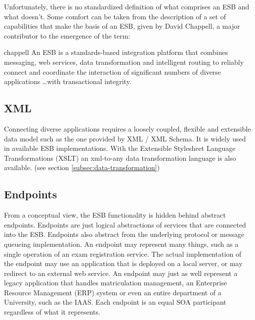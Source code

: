 \newpage
{}
Unfortunately, there is no standardized definition of what comprises an ESB and
what doesn't\supercite{wiki-de}. Some comfort can be taken from the description of a
set of capabilities that make the basis of an ESB, given by David Chappell, a
major contributor to the emergence of the term: 

\begin{mycite}{chappell}
An ESB is a standards-based integration platform that
combines messaging, web services, data transformation and intelligent routing to
reliably connect and coordinate the interaction of significant numbers of
diverse applications \ldots with transactional integrity.
\end{mycite}

\subsection{XML}
\label{sec:xml}

Connecting diverse applications requires a loosely coupled, flexible and
extensible data model such as the one provided by XML / XML Schema. It is widely
used in available ESB implementations\supercite{chappell}. With the Extensible Stylesheet
Language Transformations (XSLT) an xml-to-any data transformation language is also
available. (see section \ref{subsec:data-transformation})

\subsection{Endpoints}
\label{sec:endpoints}

From a conceptual view, the ESB functionality is hidden behind
abstract endpoints. Endpoints are just logical abstractions of services that are
connected into the ESB. Endpoints also abstract from the underlying protocol or
message queueing implementation. An endpoint may represent many things, such as a
single operation of an exam registration service. The actual implementation of
the endpoint may use an application that is deployed on a local server, or may
redirect to an external web service. An endpoint may just as well represent a
legacy application that handles matriculation management, an Enterprise Resource
Management (ERP) system or even an entire department of a University, such as the
IAAS. Each endpoint is an equal SOA participant regardless of what it
represents.

